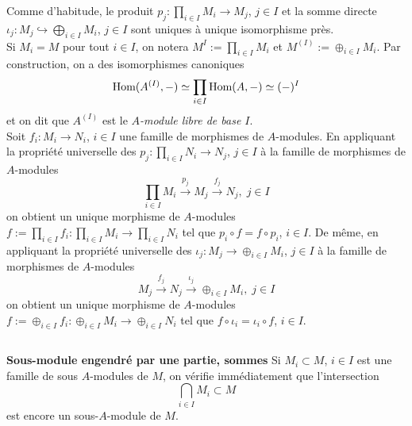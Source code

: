 \documentclass[a4paper, 12pt]{amsart}
\begin{document}
 \noindent Comme d'habitude, le produit $p_{j}:\prod_{i\in I}M_{i}\rightarrow M_{j}$, $j\in I$ et la somme directe $\iota_{j}:M_{j}\hookrightarrow \bigoplus_{i\in I}M_{i}$, $j\in I$ sont uniques \`a unique isomorphisme pr\`es. \\

 


\noindent Si $M_{i}=M$ pour tout $i\in I$, on notera $M^{I}:=\prod_{i\in I}M_{i}$ et $M^{(I)}:=\oplus_{i\in I}M_{i}$. Par construction, on a des isomorphismes   canoniques
$$ \hbox{\rm Hom}(A^{(I)},-)\simeq \prod_{i\in I}\hbox{\rm Hom}(A,-)\simeq (-)^{I}$$
et on dit que $A^{(I)}$ est le \textit{$A$-module libre de base $I$}.\\


\noindent Soit $f_i:M_i\rightarrow N_i$, $i\in I$ une famille de morphismes de $A$-modules. En appliquant la propri\'et\'e universelle des $p_j:\prod_{i\in I}N_i\rightarrow N_j$, $j\in I$ \`a la famille de morphismes de $A$-modules 
$$ \prod_{i\in I}M_i\stackrel{p_j}{\rightarrow}M_j\stackrel{f_j}{\rightarrow} N_j,\; j\in I$$
on obtient un unique morphisme de $A$-modules $f:=\prod_{i\in I}f_i:\prod_{i\in I}M_i\rightarrow \prod_{i\in I}N_i$ tel que $p_i\circ f=f\circ p_i$, $i\in I$.   De m\^eme,  en appliquant la propri\'et\'e universelle des $\iota_j:M_j\rightarrow \oplus_{i\in I}M_i$, $j\in I$ \`a la famille de morphismes de $A$-modules 
$$ M_j\stackrel{f_j}{\rightarrow}N_j\stackrel{\iota_j}{\rightarrow} \oplus_{i\in I}M_i,\; j\in I$$
on obtient un unique morphisme de $A$-modules $f:=\oplus_{i\in I}f_i:\oplus_{i\in I}M_i\rightarrow \oplus_{i\in I}N_i$ tel que $  f\circ \iota_i=  \iota_i\circ f$, $i\in I$.  

\subsection{}\textbf{Sous-module engendr\'e par une partie, sommes}  Si $M_{i}\subset M$, $i\in I$ est une famille de sous $A$-modules de $M$, on v\'erifie imm\'ediatement que l'intersection $$\bigcap_{i\in I}M_{i}\subset M$$ est encore un sous-$A$-module de $M$.\\
\end{document}
